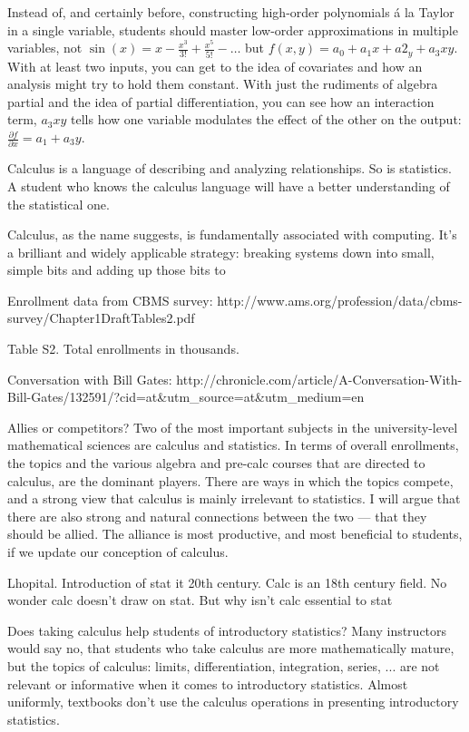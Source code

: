 Instead of, and certainly before, constructing high-order polynomials \'{a} la Taylor in a single variable, students should master low-order approximations in multiple variables, not $\sin(x) = x - \frac{x^3}{3!} + \frac{x^5}{5!} - \ldots$ but $f(x,y) = a_0 + a_1 x + a2_y + a_3 x y$. With at least two inputs, you can get to the idea of covariates and how an analysis might try to hold them constant.   With just the rudiments of algebra partial and the idea of partial differentiation, you can see how an interaction term, $a_3 x y$ tells how one variable modulates the effect of the other on the output: 
$\frac{\partial f}{\partial x} = a_1 + a_3 y$. 

Calculus is a language of describing and analyzing relationships.  So is statistics.  A student who knows the calculus language will have a better understanding of the statistical one.



Calculus, as the name suggests, is fundamentally associated with computing.  It's a brilliant and widely applicable strategy: breaking systems down into small, simple bits and adding up those bits to 




Enrollment data from CBMS survey: http://www.ams.org/profession/data/cbms-survey/Chapter1DraftTables2.pdf

Table S2.  Total enrollments in thousands.

Conversation with Bill Gates: http://chronicle.com/article/A-Conversation-With-Bill-Gates/132591/?cid=at&utm_source=at&utm_medium=en

Allies or competitors?  Two of the most important subjects in the university-level mathematical sciences are calculus and statistics. In terms of overall enrollments, the topics and the various algebra and pre-calc courses that are directed to calculus, are the dominant players.  There are ways in which the topics compete, and a strong view that calculus is mainly irrelevant to statistics. I will argue that there are also strong and natural connections between the two --- that they should be allied. The alliance is most productive, and most beneficial to students, if we update our conception of calculus.

Lhopital. Introduction of stat it 20th century. Calc is an 18th century field. No wonder calc doesn't draw on stat. But why isn't calc essential to stat


Does taking calculus help students of introductory statistics?  Many instructors would say no, that students who take calculus are more mathematically mature, but the topics of calculus: limits, differentiation, integration, series, ... are not relevant or informative when it comes to introductory statistics.  Almost uniformly, textbooks don't use the calculus operations in presenting introductory statistics.

